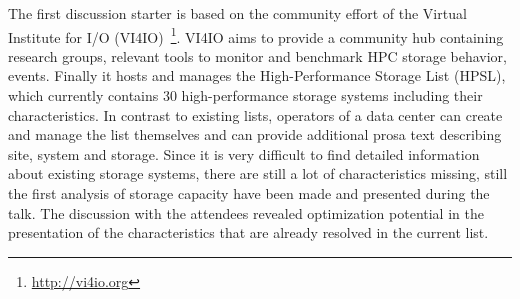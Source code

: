 \documentclass{llncs}
\begin{document}
The first discussion starter is based on the community effort of the Virtual Institute for I/O (VI4IO)~\footnote{\url{http://vi4io.org}}.
VI4IO aims to provide a community hub containing research groups, relevant tools to monitor and benchmark HPC storage behavior, events. 
Finally it hosts and manages the High-Performance Storage List (HPSL), which currently contains 30 high-performance storage systems including their characteristics.
In contrast to existing lists, operators of a data center can create and manage the list themselves and can provide additional prosa text describing site, system and storage.
Since it is very difficult to find detailed information about existing storage systems, there are still a lot of characteristics missing, still the first analysis of storage capacity have been made and presented during the talk.
The discussion with the attendees revealed optimization potential in the presentation of the characteristics that are already resolved in the current list.
\end{document}
